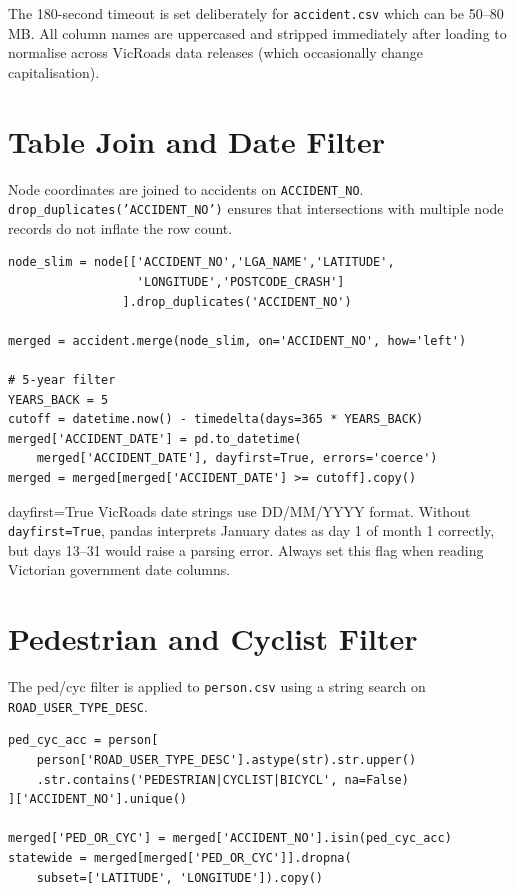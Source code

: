 \documentclass[11pt,a4paper,openany]{book}
\begin{document}
The 180-second timeout is set deliberately for \texttt{accident.csv} which can be
50--80\,MB.  All column names are uppercased and stripped immediately after loading to
normalise across VicRoads data releases (which occasionally change capitalisation).

\section{Table Join and Date Filter}

Node coordinates are joined to accidents on \texttt{ACCIDENT\_NO}.
\texttt{drop\_duplicates('ACCIDENT\_NO')} ensures that intersections with multiple
node records do not inflate the row count.

\begin{lstlisting}[style=python, caption={Join node to accident, filter last 5 years.}]
node_slim = node[['ACCIDENT_NO','LGA_NAME','LATITUDE',
                  'LONGITUDE','POSTCODE_CRASH']
                ].drop_duplicates('ACCIDENT_NO')

merged = accident.merge(node_slim, on='ACCIDENT_NO', how='left')

# 5-year filter
YEARS_BACK = 5
cutoff = datetime.now() - timedelta(days=365 * YEARS_BACK)
merged['ACCIDENT_DATE'] = pd.to_datetime(
    merged['ACCIDENT_DATE'], dayfirst=True, errors='coerce')
merged = merged[merged['ACCIDENT_DATE'] >= cutoff].copy()
\end{lstlisting}

\begin{warnbox}{dayfirst=True}
VicRoads date strings use DD/MM/YYYY format.  Without \texttt{dayfirst=True},
pandas interprets January dates as day 1 of month 1 correctly, but days 13--31
would raise a parsing error.  Always set this flag when reading Victorian government
date columns.
\end{warnbox}

\section{Pedestrian and Cyclist Filter}

The ped/cyc filter is applied to \texttt{person.csv} using a string search on
\texttt{ROAD\_USER\_TYPE\_DESC}.

\begin{lstlisting}[style=python, caption={Extracting ped/cyc accident IDs from person.csv.}]
ped_cyc_acc = person[
    person['ROAD_USER_TYPE_DESC'].astype(str).str.upper()
    .str.contains('PEDESTRIAN|CYCLIST|BICYCL', na=False)
]['ACCIDENT_NO'].unique()

merged['PED_OR_CYC'] = merged['ACCIDENT_NO'].isin(ped_cyc_acc)
statewide = merged[merged['PED_OR_CYC']].dropna(
    subset=['LATITUDE', 'LONGITUDE']).copy()
\end{lstlisting}
\end{document}
